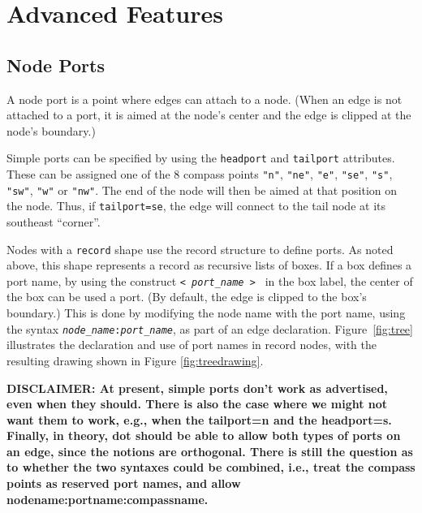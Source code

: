 \documentclass[11pt]{article}
\begin{document}
\section{Advanced Features}

\subsection{Node Ports}
\label{sect:ports}

A node port is a point where edges can attach to a node.
(When an edge is not attached to a port, it is aimed at the node's center
and the edge is clipped at the node's boundary.)

Simple ports can be specified by using the {\tt headport}
and {\tt tailport} attributes. These can be assigned one of the
8 compass points {\tt "n"}, {\tt "ne"}, {\tt "e"}, {\tt "se"}, 
{\tt "s"}, {\tt "sw"}, {\tt "w"} or  {\tt "nw"}. The end of the
node will then be aimed at that position on the node. Thus, if
{\tt tailport=se}, the edge will connect to the tail node at
its southeast ``corner''.

Nodes with a {\tt record} shape use the record structure to define ports.
As noted above,
this shape represents a record as recursive lists of boxes. If
a box defines a port name, by using the construct
{\tt < {\it port\_name} > }  in the box label,
the center of the box can be used a port. 
(By default, the edge is clipped to the box's boundary.)
This is done by modifying the node name with the
port name, using the syntax {\tt {\it node\_name}:{\it port\_name}}, 
as part of an edge declaration. 
Figure~\ref{fig:tree} illustrates the declaration and use of
port names in record nodes, with the resulting drawing shown
in Figure \ref{fig:treedrawing}.

{\bf DISCLAIMER: At present, simple ports don't work as advertised, even when
they should. There is also the case where we might not want them to work,
e.g., when the tailport=n and the headport=s. Finally, in theory, dot
should be able to allow both types of ports on an edge, since the notions
are orthogonal. There is still the question as to whether the two syntaxes
could be combined, i.e., treat the compass points as reserved port names,
and allow nodename:portname:compassname.}
\end{document}
